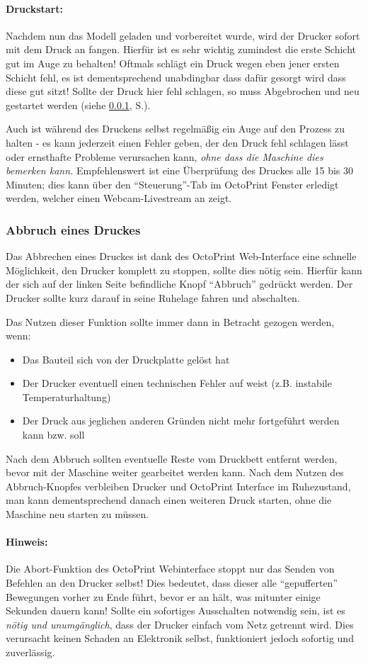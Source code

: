 \paragraph{Druckstart:} Nachdem nun das Modell geladen und vorbereitet wurde, wird der Drucker sofort mit dem Druck an fangen. Hierfür ist es sehr wichtig zumindest die erste Schicht gut im Auge zu behalten! Oftmals schlägt ein Druck wegen eben jener ersten Schicht fehl, es ist dementsprechend unabdingbar dass dafür gesorgt wird dass diese gut sitzt! Sollte der Druck hier fehl schlagen, so muss Abgebrochen und neu gestartet werden (siehe \ref{ABORTING}, S.\pageref{ABORTING}). 

Auch ist während des Druckens selbst regelmäßig ein Auge auf den Prozess zu halten - es kann jederzeit einen Fehler geben, der den Druck fehl schlagen lässt oder ernsthafte Probleme verursachen kann, \emph{ohne dass die Maschine dies bemerken kann.} Empfehlenswert ist eine Überprüfung des Druckes alle 15 bis 30 Minuten; dies kann über den "`Steuerung"'-Tab im OctoPrint Fenster erledigt werden, welcher einen Webcam-Livestream an zeigt.

\subsubsection{Abbruch eines Druckes}
\label{ABORTING}
Das Abbrechen eines Druckes ist dank des OctoPrint Web-Interface eine schnelle Möglichkeit, den Drucker komplett zu stoppen, sollte dies nötig sein. Hierfür kann der sich auf der linken Seite befindliche Knopf "`Abbruch"' gedrückt werden. Der Drucker sollte kurz darauf in seine Ruhelage fahren und abschalten.

Das Nutzen dieser Funktion sollte immer dann in Betracht gezogen werden, wenn:
\begin{itemize}[noitemsep]
\item Das Bauteil sich von der Druckplatte gelöst hat
\item Der Drucker eventuell einen technischen Fehler auf weist (z.B. instabile Temperaturhaltung)
\item Der Druck aus jeglichen anderen Gründen nicht mehr fortgeführt werden kann bzw. soll
\end{itemize}

Nach dem Abbruch sollten eventuelle Reste vom Druckbett entfernt werden, bevor mit der Maschine weiter gearbeitet werden kann. Nach dem Nutzen des Abbruch-Knopfes verbleiben Drucker und OctoPrint Interface im Ruhezustand, man kann dementsprechend danach einen weiteren Druck starten, ohne die Maschine neu starten zu müssen.

\paragraph{Hinweis:} Die Abort-Funktion des OctoPrint Webinterface stoppt nur das Senden von Befehlen an den Drucker selbst! Dies bedeutet, dass dieser alle "`gepufferten"' Bewegungen vorher zu Ende führt, bevor er an hält, was mitunter einige Sekunden dauern kann! Sollte ein sofortiges Ausschalten notwendig sein, ist es \emph{nötig und unumgänglich}, dass der Drucker einfach vom Netz getrennt wird. Dies verursacht keinen Schaden an Elektronik selbst, funktioniert jedoch sofortig und zuverlässig.
